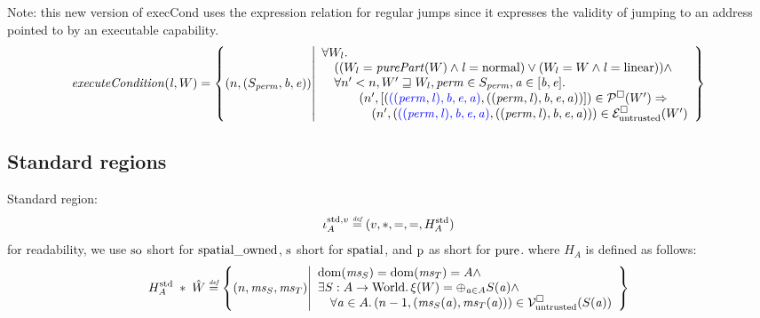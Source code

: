 \documentclass[a4paper]{article}
\begin{document}
Note: this new version of execCond uses the expression relation for regular jumps since it expresses the validity of jumping to an address pointed to by an executable capability. 
\[
  \execCond{\lin,W} = \left\{ \npair{(S_\perm,\baddr,\eaddr)} \middle|
    \begin{array}{l}
      \forall W_l \ldotp\\
      \quad ((W_l = \purePart{W} \wedge \lin = \normal) \vee (W_l = W \wedge \lin = \linear)) \wedge\\
      \quad \forall n' < n, W' \future W_l, \perm \in S_\perm, \aaddr \in [\baddr,\eaddr] \ldotp\\
      \quad \qquad \npair[n']{[\stpair[.]{((\perm,\lin),\baddr,\eaddr,\aaddr)}{((\perm,\lin),\baddr,\eaddr,\aaddr)}]} \in \lrp(W') \Rightarrow \\
      \qquad \qquad \npair[n']{\stpair[.]{((\perm,\lin),\baddr,\eaddr,\aaddr)}{((\perm,\lin),\baddr,\eaddr,\aaddr)}} \in \lre(W')
    \end{array}
    \right\}
\]

\subsection{Standard regions}
\label{sec:standard-regions}
Standard region:
\[
  \stdreg{A}{v} \defeq (v,*,=,=,H_A^{\mathrm{std}})
\]
for readability, we use $\spao$ short for $\spatialo$, $\spa$ short for $\spatial$, and $\pur$ as short for $\pure$.
where $H_A$ is defined as follows:
\[
  H_A^{\mathrm{std}} \; * \; \hat{W} \defeq \left\{ \npair{\ms_S,\ms_T} \middle|
    \begin{array}{l}
      \dom(\ms_S) = \dom(\ms_T) = A \wedge \\
      \exists S : A \fun \World \ldotp \xi(W) = \oplus_{\aaddr \in A} S(\aaddr) \wedge\\
      \quad \forall \aaddr \in A \ldotp \npair[n-1]{(\ms_S(\aaddr),\ms_T(\aaddr))} \in \lrv(S(\aaddr))
    \end{array}
  \right\}
\]
\end{document}
